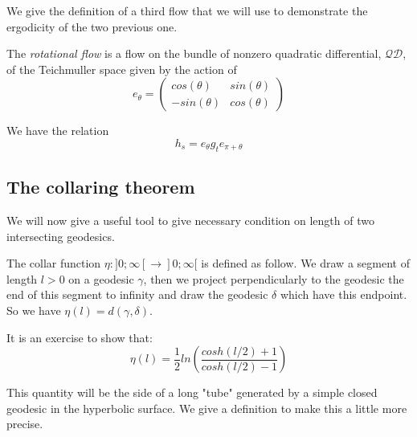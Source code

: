 



We give the definition of a third flow that we will use to demonstrate the ergodicity of the two previous one.

\begin{dfnt}
The \emph{rotational flow} is a flow on the bundle of nonzero quadratic differential, $\mathcal{QD}$, of the Teichmuller space given by the action of \[
e_{\theta}=\begin{pmatrix}
cos(\theta) & sin(\theta) \\
-sin(\theta) & cos(\theta)
\end{pmatrix}
\]
\end{dfnt}

We have the relation \[
h_s=e_{\theta}g_t e_{\pi+\theta}
\]

\subsection{The collaring theorem}

We will now give a useful tool to give necessary condition on length of two intersecting geodesics.

The collar function $\eta:]0; \infty[ \to ]0;\infty[$ is defined as follow. We draw a segment of length $l > 0$ on a geodesic $\gamma$, then we project perpendicularly to the geodesic the end of this segment to infinity and draw the geodesic $\delta$ which have this endpoint. So we have $\eta(l)=d(\gamma,\delta)$.






It is an exercise to show that:\[
\eta(l)= \frac{1}{2} ln(\frac{cosh(l/2)+1}{cosh(l/2)-1})
\]

This quantity will be the side of a long "tube" generated by a simple closed geodesic in the hyperbolic surface. We give a definition to make this a little more precise. %

